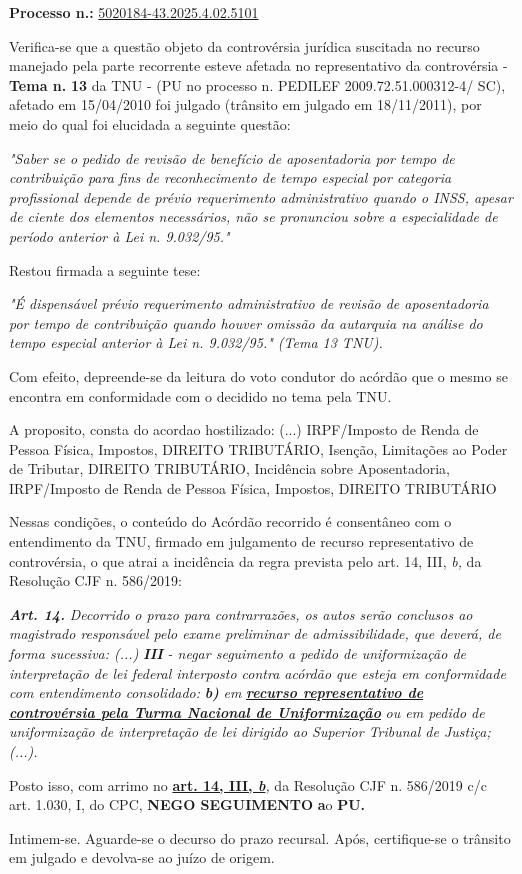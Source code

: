 \documentclass[12pt]{article}
\begin{document}
\justifying
\noindent \textbf{Processo n.: }\uline{5020184-43.2025.4.02.5101}

\noindent Verifica-se que a questão objeto da controvérsia jurídica suscitada no recurso manejado pela parte recorrente esteve afetada no representativo da controvérsia - \textbf{Tema n. }\textbf{13} da TNU - (PU no processo n. PEDILEF 2009.72.51.000312-4/ SC),  afetado em 15/04/2010 foi julgado (trânsito em julgado em 18/11/2011), por meio do qual foi elucidada a seguinte questão:

{\leftskip=3.1cm\rightskip=0.8cm\parindent=0pt \textit{"Saber se o pedido de revisão de benefício de aposentadoria por tempo de contribuição para fins de reconhecimento de tempo especial por categoria profissional depende de prévio requerimento administrativo quando o INSS, apesar de ciente dos elementos necessários, não se pronunciou sobre a especialidade de período anterior à Lei n. 9.032/95."}\par}

\noindent Restou firmada a seguinte tese:

{\leftskip=3.1cm\rightskip=0.8cm\parindent=0pt \textit{"É dispensável prévio requerimento administrativo de revisão de aposentadoria por tempo de contribuição quando houver omissão da autarquia na análise do tempo especial anterior à Lei n. 9.032/95." (Tema 13 TNU).}\par}

\noindent Com efeito, depreende-se da leitura do voto condutor do acórdão que o mesmo se encontra em conformidade com o decidido no  tema pela TNU.

\noindent A proposito, consta do acordao hostilizado: (...) IRPF/Imposto de Renda de Pessoa Física, Impostos, DIREITO TRIBUTÁRIO, Isenção, Limitações ao Poder de Tributar, DIREITO TRIBUTÁRIO, Incidência sobre Aposentadoria, IRPF/Imposto de Renda de Pessoa Física, Impostos, DIREITO TRIBUTÁRIO

\noindent Nessas condições, o conteúdo do Acórdão recorrido é consentâneo com o entendimento da TNU, firmado em julgamento de recurso representativo de controvérsia, o que atrai a incidência da regra prevista pelo art. 14, III, \textit{b,} da Resolução CJF n. 586/2019:

\noindent \textit{\textbf{Art. 14.}}\textit{ Decorrido o prazo para contrarrazões, os autos serão conclusos ao magistrado responsável pelo exame preliminar de admissibilidade, que deverá, de forma sucessiva: (...) }\textit{\textbf{III }}\textit{- negar seguimento a pedido de uniformização de interpretação de lei federal interposto contra acórdão que esteja em conformidade com entendimento consolidado: }\textit{\textbf{b)}}\textit{ em }\textit{\textbf{\uline{recurso representativo de controvérsia pela Turma Nacional de Uniformização}}}\textit{ ou em pedido de uniformização de interpretação de lei dirigido ao Superior Tribunal de Justiça;(...).}

\noindent Posto isso, com arrimo no \textbf{\uline{art. 14, III, }}\textit{\textbf{\uline{b}}}\textit{,} da Resolução CJF n. 586/2019 c/c art. 1.030, I, do CPC, \textbf{NEGO SEGUIMENTO }\textbf{a}o\textbf{ PU}\textbf{.}

\noindent Intimem-se. Aguarde-se o decurso do prazo recursal. Após, certifique-se o trânsito em julgado e devolva-se ao juízo de origem.
\end{document}
